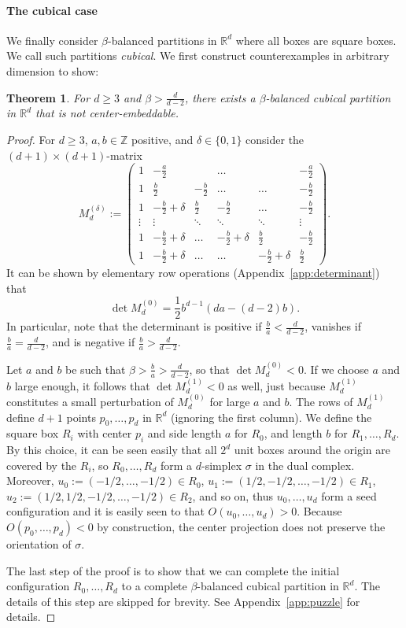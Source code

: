 \documentclass[12pt]{article}
\newcommand{\R}{\mathbb{R}}
\newcommand{\Z}{\mathbb{Z}}
\newcommand{\orient}{O}
\newtheorem{theorem}{Theorem}
\begin{document}
\paragraph{The cubical case} We finally consider $\beta$-balanced partitions
in $\R^d$ where all boxes are square boxes. 
We call such partitions \emph{cubical}.
We first construct
counterexamples in arbitrary dimension to show:

\begin{theorem}\label{thm:counter_beta_balanced_dd}
For $d\geq 3$ and $\beta>\frac{d}{d-2}$, 
there exists a $\beta$-balanced cubical partition in $\R^d$ that is not
center-embeddable.
\end{theorem}
\begin{proof}
For $d\geq 3$, $a,b\in\Z$ positive, and $\delta\in\{0,1\}$ consider the $(d+1)\times (d+1)$-matrix
\[M^{(\delta)}_d:=\left(\begin{array}{cccccc}
1 & -\frac{a}{2} &  & \ldots &  & -\frac{a}{2} \\
1 & \frac{b}{2} & -\frac{b}{2} & \ldots & \ldots & -\frac{b}{2}\\
1 & -\frac{b}{2}+\delta & \frac{b}{2} & -\frac{b}{2} & \ldots & -\frac{b}{2}\\
\vdots & \vdots & \ddots & \ddots & \ddots & \vdots\\
1 & -\frac{b}{2}+\delta & \ldots & -\frac{b}{2}+\delta & \frac{b}{2} & -\frac{b}{2}\\
1 & -\frac{b}{2}+\delta & \ldots & \ldots & -\frac{b}{2}+\delta & \frac{b}{2}
\end{array}\right).\]
It can be shown by elementary row operations (Appendix~\ref{app:determinant}) that
\[\det M^{(0)}_d=\frac{1}{2}b^{d-1}(da-(d-2)b).\]
In particular, note that the determinant is positive 
if $\frac{b}{a}<\frac{d}{d-2}$, vanishes if $\frac{b}{a}=\frac{d}{d-2}$,
and is negative if $\frac{b}{a}>\frac{d}{d-2}$.

Let $a$ and $b$ be such that 
$\beta>\frac{b}{a}> \frac{d}{d-2}$, so that
$\det M^{(0)}_d<0$. If we choose $a$ and $b$
large enough, it follows that $\det M^{(1)}_d<0$
as well, just because $M^{(1)}_d$ constitutes
a small perturbation of $M^{(0)}_d$ for large $a$ and $b$. 
The rows of $M^{(1)}_d$ 
define $d+1$ points $p_0,\ldots,p_d$ in $\R^d$ (ignoring the first column).
We define the square box $R_i$ with center $p_i$ and side length $a$
for $R_0$, and length $b$ for $R_1,\ldots,R_d$. By this choice, it can be seen
easily that all $2^d$ unit boxes around the origin are covered by
the $R_i$, so $R_0,\ldots,R_d$ form a $d$-simplex $\sigma$ in the dual complex.
Moreover, $u_0:=(-1/2,\ldots,-1/2)\in R_0$, $u_1:=(1/2,-1/2,\ldots,-1/2)\in R_1$,
$u_2:=(1/2,1/2,-1/2,\ldots,-1/2)\in R_2$, and so on, thus $u_0,\ldots,u_d$
form a seed configuration and it is easily seen to that $\orient(u_0,\ldots,u_d)>0$.
Because $\orient(p_0,\ldots,p_d)<0$ by construction, the center
projection does not preserve the orientation of $\sigma$.

The last step of the proof is to show that we can complete the initial
configuration $R_0,\ldots,R_d$ to a complete $\beta$-balanced
cubical partition in $\R^d$. The details of this step are 
skipped for brevity. See Appendix~\ref{app:puzzle} for details.
\end{proof}
\end{document}
